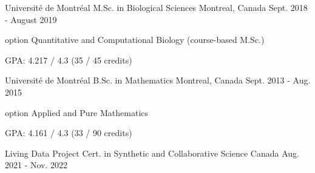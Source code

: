 \begin{cventries}

  \cventry
    {Université de Montréal} %
    {M.Sc. in Biological Sciences} %
    {Montreal, Canada} %
    {Sept. 2018 - August 2019} %
    {
      \begin{cvitems} %
        \item {option Quantitative and Computational Biology (course-based M.Sc.)}
        \item {GPA: 4.217 / 4.3 (35 / 45 credits)}
      \end{cvitems}
    }

  \cventry
    {Université de Montréal} %
    {B.Sc. in Mathematics} %
    {Montreal, Canada} %
    {Sept. 2013 - Aug. 2015} %
    {
      \begin{cvitems} %
        \item {option Applied and Pure Mathematics}
        \item {GPA: 4.161 / 4.3 (33 / 90 credits)}
      \end{cvitems}
    }
    
\end{cventries}



\begin{cventries}

  \cventry
    {Living Data Project} %
    {Cert. in Synthetic and Collaborative Science} %
    {Canada} %
    {Aug. 2021 - Nov. 2022} %
    {
      \begin{cvitems} %
      \end{cvitems}
    }
    
\end{cventries}